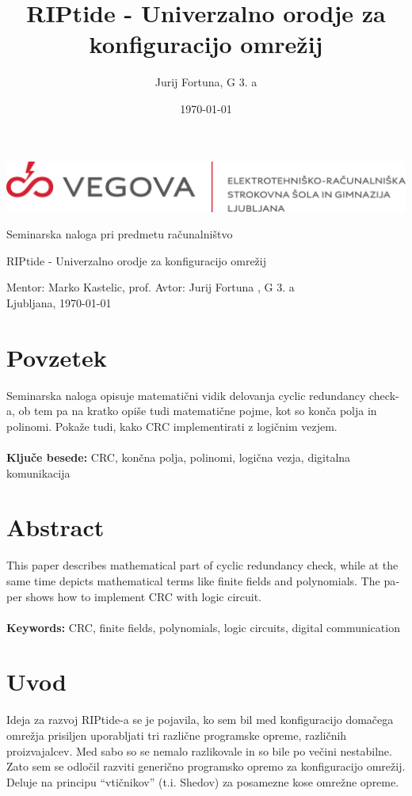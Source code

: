 \documentclass[12pt]{article}
\title{RIPtide - Univerzalno orodje za konfiguracijo omrežij}
\author{Jurij Fortuna, G 3. a}
\date{\MMYYYYdate\today}
\begin{document}
\begin{center}
	\thispagestyle{empty}
	\includegraphics[scale=1]{slike/vegova.png}

	\vspace{\fill}
	Seminarska naloga pri predmetu računalništvo

	\Huge{RIPtide - Univerzalno orodje za konfiguracijo omrežij}

	\normalsize
	\vspace{\fill}

	Mentor: Marko Kastelic, prof. \hfill Avtor: Jurij Fortuna , G 3. a\\
	\null
	Ljubljana, \MMYYYYdate\today
\end{center}
\newpage

\section*{Povzetek}
Seminarska naloga opisuje matematični vidik delovanja cyclic redundancy
check-a, ob tem pa na kratko opiše tudi matematične pojme, kot so konča
polja in polinomi. Pokaže tudi, kako CRC implementirati z
logičnim vezjem.\\\\
\textbf{Ključe besede:} CRC, končna polja, polinomi, logična vezja, digitalna
komunikacija\\

\section*{Abstract}
\foreignlanguage{english}{
	This paper describes mathematical part of cyclic
	redundancy check, while at the same time depicts mathematical terms like finite
	fields and polynomials. The paper shows how to implement CRC with logic circuit.\\
	\\
	\textbf{Keywords:} CRC, finite fields, polynomials, logic circuits, digital
	communication
}
\newpage

\tableofcontents
\newpage

\section{Uvod}
Ideja za razvoj RIPtide-a se je pojavila, ko sem bil med konfiguracijo
domačega omrežja prisiljen uporabljati tri različne programske opreme,
različnih proizvajalcev. Med sabo so se nemalo razlikovale in so bile
po večini nestabilne. Zato sem se odločil razviti generično programsko
opremo za konfiguracijo omrežij. Deluje na principu
“vtičnikov” (t.i. Shedov) za posamezne kose omrežne opreme.\\\\\\
\end{document}
